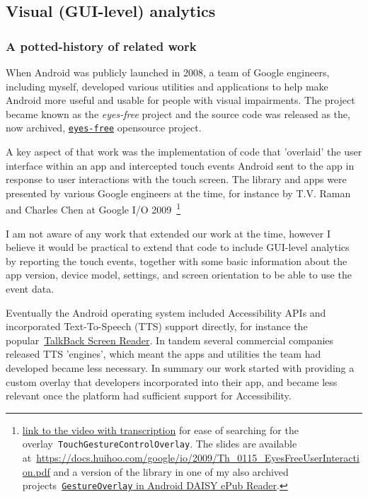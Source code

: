 \subsection{Visual (GUI-level) analytics}

\subsubsection{A potted-history of related work}
When Android was publicly launched in 2008, a team of Google engineers, including myself, developed various utilities and applications to help make Android more useful and usable for people with visual impairments. The project became known as the \emph{eyes-free} project and the source code was released as the, now archived, \href{https://code.google.com/archive/p/eyes-free/}{\texttt{eyes-free}} opensource project. 

A key aspect of that work was the implementation of code that 'overlaid' the user interface within an app and intercepted touch events Android sent to the app in response to user interactions with the touch screen. The library and apps were presented by various Google engineers at the time, for instance by T.V. Raman and Charles Chen at Google I/O 2009~\footnote{ \href{http://transcriptvids.com/v/xS-ju61vOQw.html}{link to the video with transcription} for ease of searching for the overlay~\texttt{TouchGestureControlOverlay}. The slides are available at~\url{https://docs.huihoo.com/google/io/2009/Th_0115_EyesFreeUserInteraction.pdf} and a version of the library in one of my also archived projects~\href{https://github.com/julianharty/android-daisy-epub-reader/blob/master/src/com/google/marvin/widget/GestureOverlay.java}{\texttt{GestureOverlay} in Android DAISY ePub Reader}.} 

I am not aware of any work that extended our work at the time, however I believe it would be practical to extend that code to include GUI-level analytics by reporting the touch events, together with some basic information about the app version, device model, settings, and screen orientation to be able to use the event data.

Eventually the Android operating system included Accessibility APIs and incorporated Text-To-Speech (TTS) support directly, for instance the popular~\href{https://support.google.com/accessibility/android/answer/6283677?hl=en}{TalkBack Screen Reader}. In tandem several commercial companies released TTS 'engines', which meant the apps and utilities the team had developed became less necessary. In summary our work started with providing a custom overlay that developers incorporated into their app, and became less relevant once the platform had sufficient support for Accessibility.

